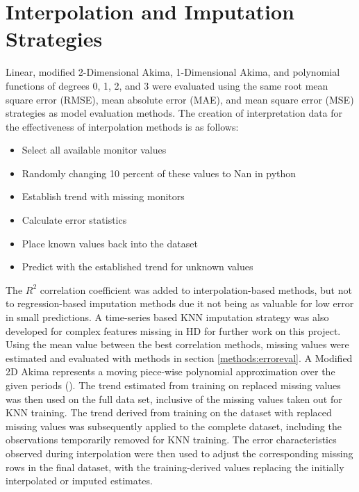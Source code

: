 \section{Interpolation and Imputation Strategies} \label{methods:inrtp} Linear, modified 2-Dimensional Akima, 1-Dimensional Akima, and polynomial functions of degrees 0, 1, 2, and 3 were evaluated using the same root mean square error (RMSE), mean absolute error (MAE), and mean square error (MSE) strategies as model evaluation methods. The creation of interpretation data for the effectiveness of interpolation methods is as follows:
\begin{itemize}
    \item Select all available monitor values
    \item Randomly changing 10 percent of these values to Nan in python
    \item Establish trend with missing monitors
    \item Calculate error statistics
    \item Place known values back into the dataset
    \item Predict with the established trend for unknown values
\end{itemize}
The $R^2$ correlation coefficient was added to interpolation-based methods, but not to regression-based imputation methods due it not being as valuable for low error in small predictions. A time-series based KNN imputation strategy was also developed for complex features missing in HD for further work on this project. Using the mean value between the best correlation methods, missing values were estimated and evaluated with methods in section \ref{methods:erroreval}. A Modified 2D Akima represents a moving piece-wise polynomial approximation over the given periods (\cite{akima_new_1970}). The trend estimated from training on replaced missing values was then used on the full data set, inclusive of the missing values taken out for KNN training. The trend derived from training on the dataset with replaced missing values was subsequently applied to the complete dataset, including the observations temporarily removed for KNN training. The error characteristics observed during interpolation were then used to adjust the corresponding missing rows in the final dataset, with the training-derived values replacing the initially interpolated or imputed estimates.
